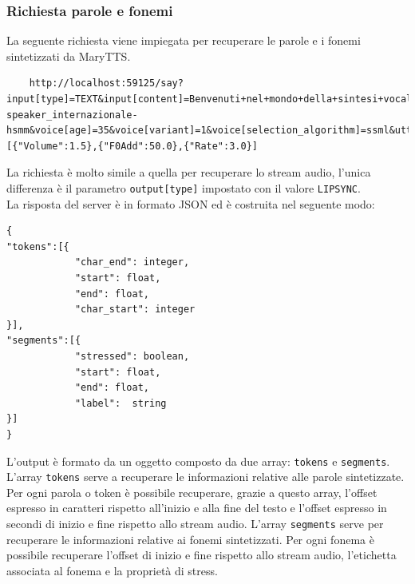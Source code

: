 \subsubsection{Richiesta parole e fonemi}
La seguente richiesta viene impiegata per recuperare le parole e i fonemi sintetizzati da MaryTTS.
\begin{lstlisting}
	http://localhost:59125/say?input[type]=TEXT&input[content]=Benvenuti+nel+mondo+della+sintesi+vocale.&input[locale]=it&output[type]=LIPSYNC&voice[gender]=male&voice[name]=istc-speaker_internazionale-hsmm&voice[age]=35&voice[variant]=1&voice[selection_algorithm]=ssml&utterance[effects]=[{"Volume":1.5},{"F0Add":50.0},{"Rate":3.0}]
\end{lstlisting}
La richiesta è molto simile a quella per recuperare lo stream audio, l'unica differenza è il parametro \texttt{output[type]} impostato con il valore \texttt{LIPSYNC}.\\
La risposta del server è in formato JSON ed è costruita nel seguente modo:
\lstset{language=html,
	basicstyle=\ttfamily,
	columns=fullflexible,
	showstringspaces=false,
	breaklines=true }
\begin{lstlisting}
{
"tokens":[{ 
			"char_end": integer, 
			"start": float,
			"end": float,
			"char_start": integer
}],
"segments":[{ 
			"stressed": boolean, 
			"start": float,
			"end": float,
			"label":  string
}]
}

\end{lstlisting}
L'output è formato da un oggetto composto da due array: \texttt{tokens} e \texttt{segments}.\\
L'array \texttt{tokens} serve a recuperare le informazioni relative alle parole sintetizzate.
Per ogni parola o token è possibile recuperare, grazie a questo array, l'offset espresso in caratteri rispetto all'inizio e alla fine del testo e l'offset espresso in secondi di inizio e fine rispetto allo stream audio.
L'array \texttt{segments} serve per recuperare le informazioni relative ai fonemi sintetizzati.
Per ogni fonema è possibile recuperare l'offset di inizio e fine rispetto allo stream audio, l'etichetta associata al fonema e la proprietà di stress.


